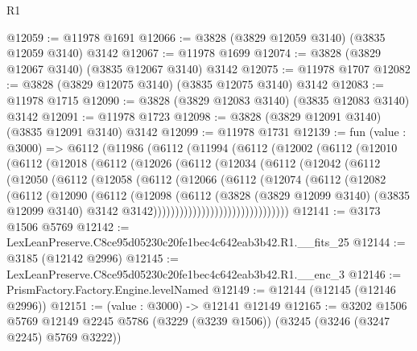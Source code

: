\begin{lexlean}{R1}
\begin{coremodule}
@12059 := @11978 @1691
@12066 := @3828 (@3829 @12059 @3140) (@3835 @12059 @3140) @3142
@12067 := @11978 @1699
@12074 := @3828 (@3829 @12067 @3140) (@3835 @12067 @3140) @3142
@12075 := @11978 @1707
@12082 := @3828 (@3829 @12075 @3140) (@3835 @12075 @3140) @3142
@12083 := @11978 @1715
@12090 := @3828 (@3829 @12083 @3140) (@3835 @12083 @3140) @3142
@12091 := @11978 @1723
@12098 := @3828 (@3829 @12091 @3140) (@3835 @12091 @3140) @3142
@12099 := @11978 @1731
@12139 := fun (value : @3000) =>
  @6112
    (@11986
      (@6112
        (@11994
          (@6112
            (@12002
              (@6112
                (@12010
                  (@6112
                    (@12018
                      (@6112
                        (@12026
                          (@6112
                            (@12034
                              (@6112
                                (@12042
                                  (@6112
                                    (@12050
                                      (@6112
                                        (@12058
                                          (@6112
                                            (@12066
                                              (@6112
                                                (@12074
                                                  (@6112
                                                    (@12082
                                                      (@6112
                                                        (@12090
                                                          (@6112
                                                            (@12098
                                                              (@6112
                                                                (@3828
                                                                  (@3829 @12099 @3140)
                                                                  (@3835 @12099 @3140)
                                                                  @3142
                                                                  @3142)))))))))))))))))))))))))))))))
@12141 := @3173 @1506 @5769
@12142 := LexLeanPreserve.C8ce95d05230c20fe1bec4c642eab3b42.R1.__fits_25
@12144 := @3185 (@12142 @2996)
@12145 := LexLeanPreserve.C8ce95d05230c20fe1bec4c642eab3b42.R1.__enc_3
@12146 := PrismFactory.Factory.Engine.levelNamed
@12149 := @12144 (@12145 (@12146 @2996))
@12151 := (value : @3000) -> @12141 @12149
@12165 := @3202
    @1506
    @5769
    @12149
    @2245
    @5786
    (@3229 (@3239 @1506))
    (@3245 (@3246 (@3247 @2245) @5769 @3222))

\end{coremodule}
\end{lexlean}
